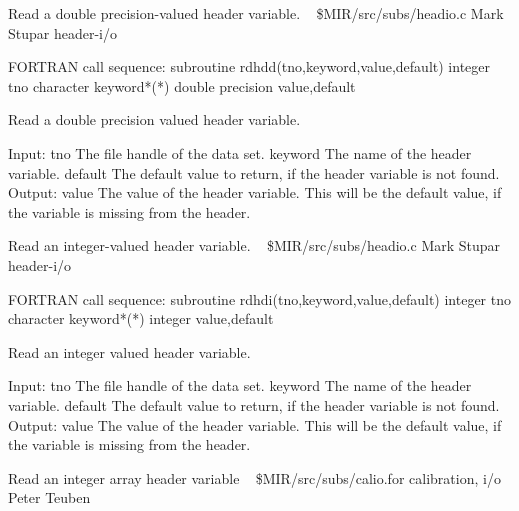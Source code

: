 %
\noindent Read a double precision-valued header variable.
\newline \ 
\newline {} \$MIR/src/subs/headio.c
\newline {} Mark Stupar
\newline {} header-i/o
\par{\tenpoint
{\eightpoint\begintt
FORTRAN call sequence:
        subroutine rdhdd(tno,keyword,value,default)
        integer tno
        character keyword*(*)
        double precision value,default

  Read a double precision valued header variable.

  Input:
    tno         The file handle of the data set.
    keyword     The name of the header variable.
    default     The default value to return, if the header variable
                is not found.
  Output:
    value       The value of the header variable. This will be the default
                value, if the variable is missing from the header.      
\endtt}
\par}
%
\noindent Read an integer-valued header variable.
\newline \ 
\newline {} \$MIR/src/subs/headio.c
\newline {} Mark Stupar
\newline \abox{Keywords:} header-i/o
\par{\tenpoint
{\eightpoint\begintt
FORTRAN call sequence:
        subroutine rdhdi(tno,keyword,value,default)
        integer tno
        character keyword*(*)
        integer value,default

  Read an integer valued header variable.

  Input:
    tno         The file handle of the data set.
    keyword     The name of the header variable.
    default     The default value to return, if the header variable
                is not found.
  Output:
    value       The value of the header variable. This will be the default
                value, if the variable is missing from the header.      
\endtt}
\par}
%
\noindent Read an integer array header variable
\newline \ 
\newline {} \$MIR/src/subs/calio.for
\newline \abox{Keywords:} calibration, i/o
\newline {} Peter Teuben
